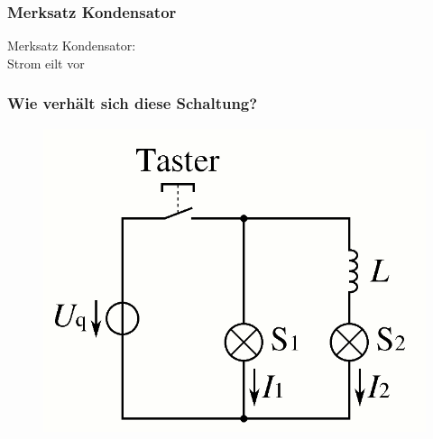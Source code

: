 \begin{frame}
  \frametitle{Merksatz Kondensator}
  \begin{block}{Merksatz}
    Kondensator:\\
    Strom eilt vor
  \end{block}
\end{frame}

\begin{frame}
  \frametitle{Wie verhält sich diese Schaltung?}
  \begin{center}
    \begin{figure}
      \includegraphics[width=.8\textwidth,height=.75\textheight,keepaspectratio]{a03/Spulenstrom.png}
    \end{figure}
  \end{center}
\end{frame}

